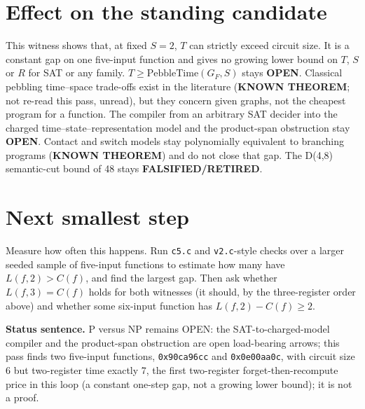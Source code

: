 \documentclass[11pt]{article}
\begin{document}
\section*{Effect on the standing candidate}
This witness shows that, at fixed $S=2$, $T$ can strictly exceed circuit size. It is a constant gap on one five-input function and gives no growing lower bound on $T$, $S$ or $R$ for SAT or any family. $T\ge\mathrm{PebbleTime}(G_F,S)$ stays \textbf{OPEN}. Classical pebbling time--space trade-offs exist in the literature (\textbf{KNOWN THEOREM}; not re-read this pass, unread), but they concern given graphs, not the cheapest program for a function. The compiler from an arbitrary SAT decider into the charged time--state--representation model and the product-span obstruction stay \textbf{OPEN}. Contact and switch models stay polynomially equivalent to branching programs (\textbf{KNOWN THEOREM}) and do not close that gap. The D(4,8) semantic-cut bound of 48 stays \textbf{FALSIFIED/RETIRED}.

\section*{Next smallest step}
Measure how often this happens. Run \texttt{c5.c} and \texttt{v2.c}-style checks over a larger seeded sample of five-input functions to estimate how many have $L(f,2)>C(f)$, and find the largest gap. Then ask whether $L(f,3)=C(f)$ holds for both witnesses (it should, by the three-register order above) and whether some six-input function has $L(f,2)-C(f)\ge2$.

\bigskip
\noindent\textbf{Status sentence.} P versus NP remains OPEN: the SAT-to-charged-model compiler and the product-span obstruction are open load-bearing arrows; this pass finds two five-input functions, \texttt{0x90ca96cc} and \texttt{0x0e00aa0c}, with circuit size 6 but two-register time exactly 7, the first two-register forget-then-recompute price in this loop (a constant one-step gap, not a growing lower bound); it is not a proof.
\end{document}
